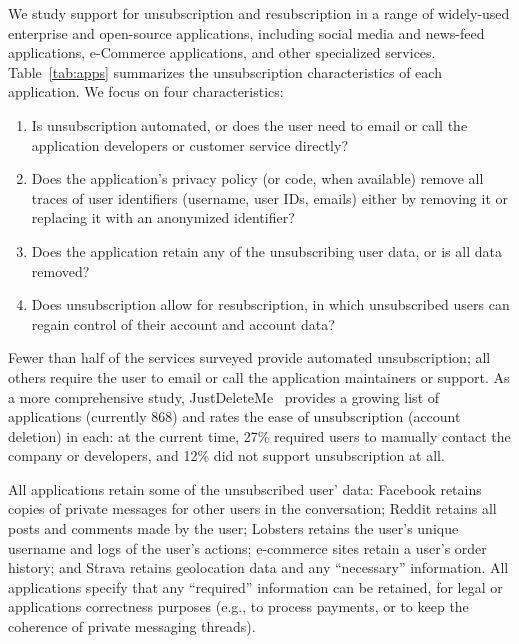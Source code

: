 We study support for unsubscription and resubscription in a range of widely-used 
enterprise and open-source applications, including social media and news-feed applications, e-Commerce
applications, and other specialized services.
Table~\ref{tab:apps} summarizes the unsubscription characteristics of each application. We focus on
four characteristics: 
\begin{enumerate}
    \item Is unsubscription automated, or does the user need to email or call the
application developers or customer service directly? 
    \item Does the application's privacy policy (or code, when available) remove all traces of user
        identifiers (\eg username, user IDs, emails) either by removing it or replacing it with an
        anonymized identifier?
    \item Does the application retain any of the unsubscribing user data, or is all data removed?
    \item Does unsubscription allow for resubscription, in which unsubscribed users can regain control of their
        account and account data?
\end{enumerate}
Fewer than half of the services surveyed provide automated unsubscription; all others require the
user to email or call the application maintainers or support. As a more comprehensive study,
JustDeleteMe~\cite{jdm} provides a growing list of applications (currently 868) and rates the ease
of unsubscription (account deletion) in each: at the current time, 27\% required users to manually
contact the company or developers, and 12\% did not support unsubscription at all. 

All applications retain some of the unsubscribed user' data: Facebook retains copies of private
messages for other users in the conversation; Reddit retains all posts and comments made by the
user; Lobsters retains the user's unique username and logs of the user's actions; e-commerce sites
retain a user's order history; and Strava retains geolocation data and any ``necessary''
information. All applications specify that any ``required'' information can be retained, for legal
or applications correctness purposes (e.g., to process payments, or to keep the coherence of private
messaging threads).  

